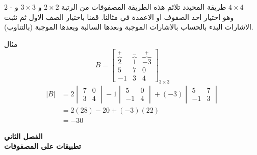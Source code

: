 	\begin{frame}
		\begin{exampleblock}{2 - طريقة المحيدد}
			تلائم هذه الطريقة المصفوفات من الرتبة $2\times2$ و $3\times3$ و $4\times4$ \\
			وهو اختيار احد الصفوف او الاعمدة في مثالنا. قمنا باختيار الصف الاول ثم نثبت الاشارات البدء بالحساب بالاشارات الموجبة وبعدها السالبة وبعدها الموجبة (بالتناوب).
		\end{exampleblock}
		
		\begin{exampleblock}{مثال}
			\[
			B= 
			\begin{bmatrix}
				\overbrace{2}^{+} & \overbrace{1}^{-}& \overbrace{-3}^{+}\\
				5 &7 &0 \\
				-1& 3& 4 
			\end{bmatrix}_{3\times 3}
			\] 
			\begin{align*}
				|B| &= 2 
				\begin{vmatrix}
					7&0\\3&4
				\end{vmatrix}
				-1
				\begin{vmatrix}
					5&0 \\ -1&4
				\end{vmatrix}
				+(-3)
				\begin{vmatrix}
					5&7\\
					-1&3
				\end{vmatrix}\\
				&= 2(28) - 20 + (-3)(22)\\
				&= -30
			\end{align*}
		\end{exampleblock}
	\end{frame}
	
	
	\begin{frame}
		\begin{center}
			\Huge
			\textbf{الفصل الثاني}\\
			\textbf{تطبيقات على المصفوفات}
		\end{center}
	\end{frame}


